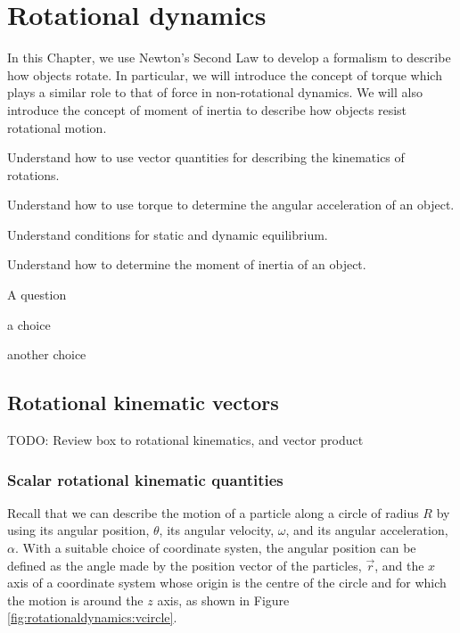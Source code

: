
\chapter{Rotational dynamics}
\label{chapter:rotationaldynamics}
In this Chapter, we use Newton's Second Law to develop a formalism to describe how objects rotate. In particular, we will introduce the concept of torque which plays a similar role to that of force in non-rotational dynamics. We will also introduce the concept of moment of inertia to describe how objects resist rotational motion. 

\begin{learningObjectives}{
 \item Understand how to use vector quantities for describing the kinematics of rotations.
 \item Understand how to use torque to determine the angular acceleration of an object.
 \item Understand conditions for static and dynamic equilibrium. 
 \item Understand how to determine the moment of inertia of an object.
 }
\end{learningObjectives}

\begin{opening}
\begin{MCquestion}{A question}
\item a choice
\item another choice %
\end{MCquestion}
\end{opening}

\section{Rotational kinematic vectors}
TODO: Review box to rotational kinematics, and vector product

\subsection{Scalar rotational kinematic quantities}
Recall that we can describe the motion of a particle along a circle of radius $R$ by using its angular position, $\theta$, its angular velocity, $\omega$, and its angular acceleration, $\alpha$. With a suitable choice of coordinate systen, the angular position can be defined as the angle made by the position vector of the particles, $\vec r$, and the $x$ axis of a coordinate system whose origin is the centre of the circle and for which the motion is around the $z$ axis, as shown in Figure \ref{fig:rotationaldynamics:vcircle}. 

